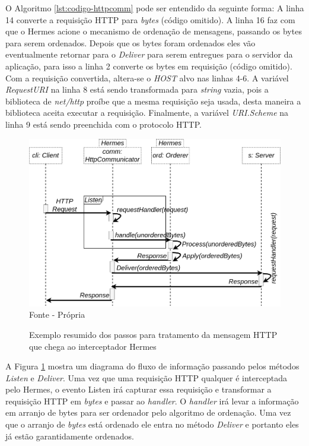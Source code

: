 

O Algoritmo \ref{lst:codigo-httpcomm} pode ser entendido da seguinte forma: A linha 14 converte a requisição \gls{HTTP} para \textit{bytes} (código omitido). A linha 16 faz com que o Hermes acione o mecanismo de ordenação de mensagens, passando os bytes para serem ordenados. Depois que os bytes foram ordenados eles vão eventualmente retornar para o \textit{Deliver} para serem entregues para o servidor da aplicação, para isso a linha 2 converte os bytes em requisição (código omitido). Com a requisição convertida, altera-se o \textit{HOST} alvo nas linhas 4-6. A variável \textit{RequestURI} na linha 8 está sendo transformada para \textit{string} vazia, pois a biblioteca de \textit{net/http} proíbe que a mesma requisição seja usada, desta maneira a biblioteca aceita executar a requisição. Finalmente, a variável \textit{URI.Scheme} na linha 9 está sendo preenchida com o protocolo \gls{HTTP}.

\begin{figure}[!htb]
\centering
\caption{Exemplo resumido dos passos para tratamento da mensagem HTTP que chega ao interceptador Hermes}
\includegraphics[width=\linewidth]{figures/deliver-listen-logic.drawio.png}
{\flushleft Fonte - Própria}
\label{fig:deliver-listen-logic}
\end{figure}

A Figura \ref{fig:deliver-listen-logic} mostra um diagrama do fluxo de informação passando pelos métodos \textit{Listen} e \textit{Deliver}. Uma vez que uma requisição HTTP qualquer é interceptada pelo Hermes, o evento Listen irá capturar essa requisição e transformar a requisição HTTP em \textit{bytes} e passar ao \textit{handler}. O \textit{handler} irá levar a informação em arranjo de bytes para ser ordenador pelo algoritmo de ordenação. Uma vez que o arranjo de \textit{bytes} está ordenado ele entra no método \textit{Deliver} e portanto eles já estão garantidamente ordenados.


